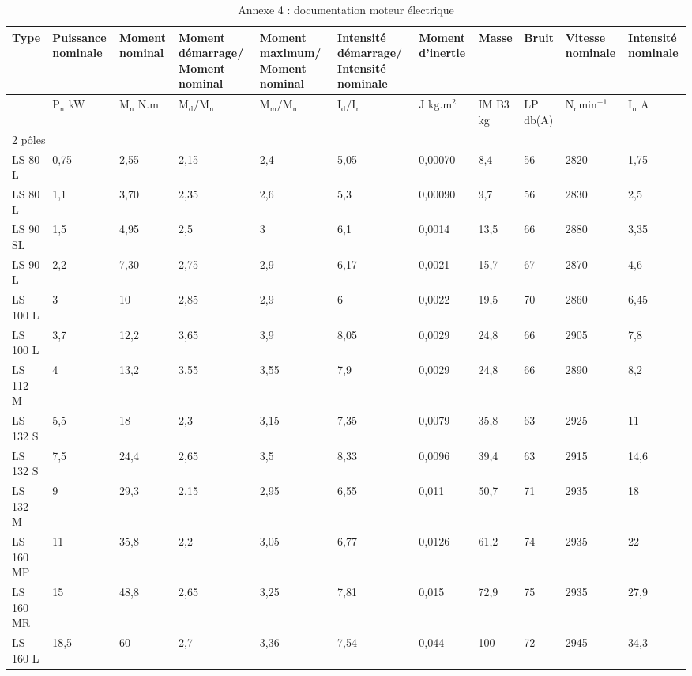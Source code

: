 \documentclass[10pt]{article}
\begin{document}
\begin{table}[h]
\begin{center}
\captionsetup{labelformat=empty}
\caption{Annexe 4 : documentation moteur électrique}
\begin{tabular}[t]{|l|l|l|l|l|l|l|l|l|l|l|}
\hline
\multirow{2}{*}{Type} & Puissance nominale & Moment nominal & Moment démarrage/ Moment nominal & Moment maximum/ Moment nominal & Intensité démarrage/ Intensité nominale & Moment d'inertie & Masse & Bruit & Vitesse nominale & Intensité nominale \\
\hline
 & $\mathrm{P}_{\mathrm{n}}$ kW & $\mathrm{M}_{\mathrm{n}}$ N.m & $\mathrm{M}_{\mathrm{d}} / \mathrm{M}_{\mathrm{n}}$ & $\mathrm{M}_{\mathrm{m}} / \mathrm{M}_{\mathrm{n}}$ & $\mathrm{I}_{\mathrm{d}} / \mathrm{I}_{\mathrm{n}}$ & J $\mathrm{kg} . \mathrm{m}^{2}$ & IM B3 kg & LP db(A) & $\mathrm{N}_{\mathrm{n}} \mathrm{min}^{-1}$ & $\mathrm{I}_{\mathrm{n}}$ A \\
\hline
\multicolumn{11}{|l|}{2 pôles} \\
\hline
LS 80 L & 0,75 & 2,55 & 2,15 & 2,4 & 5,05 & 0,00070 & 8,4 & 56 & 2820 & 1,75 \\
\hline
LS 80 L & 1,1 & 3,70 & 2,35 & 2,6 & 5,3 & 0,00090 & 9,7 & 56 & 2830 & 2,5 \\
\hline
LS 90 SL & 1,5 & 4,95 & 2,5 & 3 & 6,1 & 0,0014 & 13,5 & 66 & 2880 & 3,35 \\
\hline
LS 90 L & 2,2 & 7,30 & 2,75 & 2,9 & 6,17 & 0,0021 & 15,7 & 67 & 2870 & 4,6 \\
\hline
LS 100 L & 3 & 10 & 2,85 & 2,9 & 6 & 0,0022 & 19,5 & 70 & 2860 & 6,45 \\
\hline
LS 100 L & 3,7 & 12,2 & 3,65 & 3,9 & 8,05 & 0,0029 & 24,8 & 66 & 2905 & 7,8 \\
\hline
LS 112 M & 4 & 13,2 & 3,55 & 3,55 & 7,9 & 0,0029 & 24,8 & 66 & 2890 & 8,2 \\
\hline
LS 132 S & 5,5 & 18 & 2,3 & 3,15 & 7,35 & 0,0079 & 35,8 & 63 & 2925 & 11 \\
\hline
LS 132 S & 7,5 & 24,4 & 2,65 & 3,5 & 8,33 & 0,0096 & 39,4 & 63 & 2915 & 14,6 \\
\hline
LS 132 M & 9 & 29,3 & 2,15 & 2,95 & 6,55 & 0,011 & 50,7 & 71 & 2935 & 18 \\
\hline
LS 160 MP & 11 & 35,8 & 2,2 & 3,05 & 6,77 & 0,0126 & 61,2 & 74 & 2935 & 22 \\
\hline
LS 160 MR & 15 & 48,8 & 2,65 & 3,25 & 7,81 & 0,015 & 72,9 & 75 & 2935 & 27,9 \\
\hline
LS 160 L & 18,5 & 60 & 2,7 & 3,36 & 7,54 & 0,044 & 100 & 72 & 2945 & 34,3 \\

\end{tabular}
\end{center}
\end{table}
\end{document}

